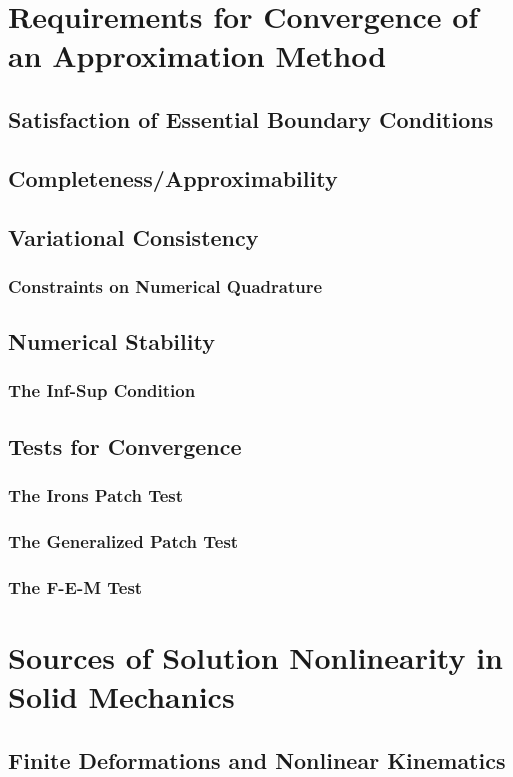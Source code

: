 \section{Requirements for Convergence of an Approximation Method}
\subsection{Satisfaction of Essential Boundary Conditions}
\subsection{Completeness/Approximability}
\subsection{Variational Consistency}
\subsubsection{Constraints on Numerical Quadrature}
\subsection{Numerical Stability}
\subsubsection{The Inf-Sup Condition}
\subsection{Tests for Convergence}
\subsubsection{The Irons Patch Test}
\subsubsection{The Generalized Patch Test}
\subsubsection{The F-E-M Test}

\section{Sources of Solution Nonlinearity in Solid Mechanics}
\subsection{Finite Deformations and Nonlinear Kinematics}
